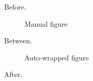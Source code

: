 Before.

\begin{island}
\begin{figure}
\caption{Manual figure}
\label{fig:manual}
\end{figure}
\end{island}

Between.

\begin{figure}
\caption{Auto-wrapped figure}
\label{fig:auto}
\end{figure}

After.
